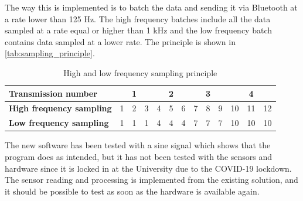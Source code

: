 The way this is implemented is to batch the data and sending it via Bluetooth at a rate lower than 125 Hz. The high frequency batches include all the data sampled at a rate equal or higher than 1 kHz and the low frequency batch contains data sampled at a lower rate. The principle is shown in \autoref{tab:sampling_principle}.

\begin{table}[htbp]
\centering
\caption{High and low frequency sampling principle}
\label{tab:sampling_principle}
\begin{tabular}{|l|lll|lll|lll|lll|}
\hline
\textbf{Transmission number} &
  \multicolumn{3}{c|}{\textbf{1}} &
  \multicolumn{3}{c|}{\textbf{2}} &
  \multicolumn{3}{c|}{\textbf{3}} &
  \multicolumn{3}{c|}{\textbf{4}} \\ \hline
\textbf{High frequency sampling} &
  \cellcolor[HTML]{9B9B9B}1 &
  \cellcolor[HTML]{9B9B9B}2 &
  \cellcolor[HTML]{9B9B9B}3 &
  \cellcolor[HTML]{9B9B9B}4 &
  \cellcolor[HTML]{9B9B9B}5 &
  \cellcolor[HTML]{9B9B9B}6 &
  \cellcolor[HTML]{9B9B9B}7 &
  \cellcolor[HTML]{9B9B9B}8 &
  \cellcolor[HTML]{9B9B9B}9 &
  \cellcolor[HTML]{9B9B9B}10 &
  \cellcolor[HTML]{9B9B9B}11 &
  \cellcolor[HTML]{9B9B9B}12 \\
\textbf{Low frequency sampling} &
  \cellcolor[HTML]{9B9B9B}1 &
  1 &
  1 &
  \cellcolor[HTML]{9B9B9B}4 &
  4 &
  4 &
  \cellcolor[HTML]{9B9B9B}7 &
  7 &
  7 &
  \cellcolor[HTML]{9B9B9B}10 &
  10 &
  10 \\ \hline
\end{tabular}
\end{table}

The new software has been tested with a sine signal which shows that the program does as intended, but it has not been tested with the sensors and hardware since it is locked in at the University due to the COVID-19 lockdown. The sensor reading and processing is implemented from the existing solution, and it should be possible to test as soon as the hardware is available again.


